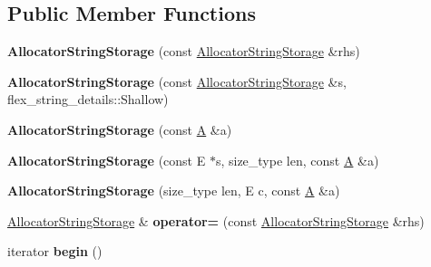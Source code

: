 \subsection*{Public Member Functions}
\begin{DoxyCompactItemize}
\item 
\hypertarget{classAllocatorStringStorage_a7bf47560b83ff3aa708678880a0f76b9}{}{\bfseries Allocator\+String\+Storage} (const \hyperlink{classAllocatorStringStorage}{Allocator\+String\+Storage} \&rhs)\label{classAllocatorStringStorage_a7bf47560b83ff3aa708678880a0f76b9}

\item 
\hypertarget{classAllocatorStringStorage_a9c57359c882762b99a16856bb2a2c003}{}{\bfseries Allocator\+String\+Storage} (const \hyperlink{classAllocatorStringStorage}{Allocator\+String\+Storage} \&s, flex\+\_\+string\+\_\+details\+::\+Shallow)\label{classAllocatorStringStorage_a9c57359c882762b99a16856bb2a2c003}

\item 
\hypertarget{classAllocatorStringStorage_a46bd13180f48f9544557ac0ee257d421}{}{\bfseries Allocator\+String\+Storage} (const \hyperlink{structA}{A} \&a)\label{classAllocatorStringStorage_a46bd13180f48f9544557ac0ee257d421}

\item 
\hypertarget{classAllocatorStringStorage_ad1b0e53aa7753bf1b4bd9bea9dd63b55}{}{\bfseries Allocator\+String\+Storage} (const E $\ast$s, size\+\_\+type len, const \hyperlink{structA}{A} \&a)\label{classAllocatorStringStorage_ad1b0e53aa7753bf1b4bd9bea9dd63b55}

\item 
\hypertarget{classAllocatorStringStorage_a7ea9ad4f9ea8445feadbd51c610c62fa}{}{\bfseries Allocator\+String\+Storage} (size\+\_\+type len, E c, const \hyperlink{structA}{A} \&a)\label{classAllocatorStringStorage_a7ea9ad4f9ea8445feadbd51c610c62fa}

\item 
\hypertarget{classAllocatorStringStorage_a93f38a341535c46278f590561fcf75f6}{}\hyperlink{classAllocatorStringStorage}{Allocator\+String\+Storage} \& {\bfseries operator=} (const \hyperlink{classAllocatorStringStorage}{Allocator\+String\+Storage} \&rhs)\label{classAllocatorStringStorage_a93f38a341535c46278f590561fcf75f6}

\item 
\hypertarget{classAllocatorStringStorage_aae01e5c36e752d0a2f0cf389ee6b88b1}{}iterator {\bfseries begin} ()\label{classAllocatorStringStorage_aae01e5c36e752d0a2f0cf389ee6b88b1}


\end{DoxyCompactItemize}
